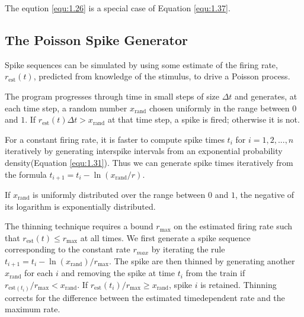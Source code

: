 \begin{rem}
The eqution \ref{equ:1.26} is a special case of Equation \ref{equ:1.37}.
\end{rem}

\subsection{The Poisson Spike Generator}

\begin{rul}
    Spike sequences can be simulated by using some estimate of the firing rate, $r_\text{est}(t)$, predicted from knowledge of the stimulus,  to drive a Poisson process.
\end{rul}

\begin{alg}
    The program progresses through time in small steps of size $\Delta t$ and generates, at each time step, a random number $x_{\text{rand}}$ chosen uniformly in the range between $0$ and $1$. If $r_{\text{est}}(t)\Delta t > x_{\text{rand}}$ at that time step, a spike is fired; otherwise it is not.
\end{alg}

\begin{alg}
    For a constant firing rate, it is faster to compute spike times $t_i$ for $i=1,2,...,n$ iteratively by generating interspike intervals from an exponential probability density(Equation \ref{equ:1.31}). Thus  we can generate spike times iteratively from the formula $t_{i+1}= t_i-\ln(x_\text{rand}/r)$.
    
 \end{alg}
\begin{rem}
    If $x_\text{rand}$ is uniformly distributed over the range between $0$ and $1$, the negative of its logarithm is exponentially distributed.
\end{rem}
 \begin{alg}
    The thinning technique requires a bound $r_\text{max}$ on the estimated firing rate such that $r_{\text{est}}(t) \leq r_\text{max}$    at all times. We first generate a spike sequence corresponding to the constant rate $r_{max}$ by iterating the rule $t_{i+1} = t_i - \ln(x_{\text{rand}})/r_\text{max}$. The spike are then thinned by generating another $x_{\text{rand}}$ for each $i$ and removing the spike at time $t_i$ from the train if $r_{\text{est}(t_i)}/r_{\text{max}} < x_{\text{rand}}$. If $r_\text{est}(t_i) / r_{\text{max}} \geq x_{\text{rand}}$, spike $i$ is retained. Thinning corrects for the difference between the estimated timedependent rate and the maximum rate.
    \end{alg} 

